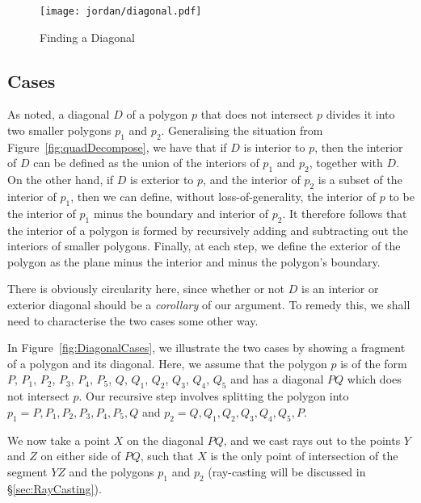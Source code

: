 \begin{figure}
\centering
\texttt{[image: jordan/diagonal.pdf]}
\caption{Finding a Diagonal}
\label{fig:SqueezeDemo}
\end{figure}

\subsection{Cases}
As noted, a diagonal $D$ of a polygon $p$ that does not intersect $p$ divides it into two smaller polygons $p_1$ and $p_2$. Generalising the situation from Figure~\ref{fig:quadDecompose}, we have that if $D$ is interior to $p$, then the interior of $D$ can be defined as the union of the interiors of $p_1$ and $p_2$, together with $D$. On the other hand, if $D$ is exterior to $p$, and the interior of $p_2$ is a subset of the interior of $p_1$, then we can define, without loss-of-generality, the interior of $p$ to be the interior of $p_1$ minus the boundary and interior of $p_2$. It therefore follows that the interior of a polygon is formed by recursively adding and subtracting out the interiors of smaller polygons. Finally, at each step, we define the exterior of the polygon as the plane minus the interior and minus the polygon's boundary.

There is obviously circularity here, since whether or not $D$ is an interior or exterior diagonal should be a \emph{corollary} of our argument. To remedy this, we shall need to characterise the two cases some other way.

In Figure~\ref{fig:DiagonalCases}, we illustrate the two cases by showing a fragment of a polygon and its diagonal. Here, we assume that the polygon $p$ is of the form $P$, $P_1$, $P_2$, $P_3$, $P_4$, $P_5$, $Q$, $Q_1$, $Q_2$, $Q_3$, $Q_4$, $Q_5$ and has a diagonal $PQ$ which does not intersect $p$. Our recursive step involves splitting the polygon into $p_1 = P, P_1, P_2, P_3, P_4, P_5, Q$ and $p_2 = Q, Q_1, Q_2, Q_3, Q_4, Q_5, P.$

We now take a point $X$ on the diagonal $PQ$, and we cast rays out to the points $Y$ and $Z$ on either side of $PQ$, such that $X$ is the only point of intersection of the segment $YZ$ and the polygons $p_1$ and $p_2$ (ray-casting will be discussed in \S\ref{sec:RayCasting}). 

